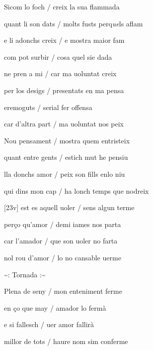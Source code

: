 \documentclass[12pt]{article}
\begin{document}
\begin{estrofa}

 Sicom lo foch / creix la sua flammada

 quant li son dats / molts fusts perq\textit{ue}ls aflam

 e li adonchs creix / e mostra maior fam

 com pot surbir / cosa quel sie dada

 ne pren a mi / car ma uoluntat creix

 per los desigs / presentats en ma pensa

 eremoguts / serial fer offensa

 car d'altra part / ma uoluntat nos peix

\end{estrofa}



\begin{estrofa}

 Nou pensament / mostra quem entristeix

 quant entre gents / estich mut he pensiu

 lla donchs amor / peix son fills enlo niu

 qui dins mon cap / ha lonch temps que nodreix

 [23v] est es aquell uoler / sens algun terme

 per\c{c}o qu'amor / demi iames nos parta

 car l'amador / que son uoler no farta

 nol rou d'amor / lo no cansable uerme

\end{estrofa}


\begin{estrofaExtra}%




\begin{tornada}

\textasciitilde{}: Tornada
:\textasciitilde{}

\end{tornada}


\end{estrofaExtra}


\begin{estrofa}

 Plena de seny / mon enteniment ferme

 en \c{c}o que may / amador lo ferm\`{a}

 e si fallesch / uer amor fallir\`{a}

 millor de tots / haure nom sim conferme

\end{estrofa}
\end{document}
